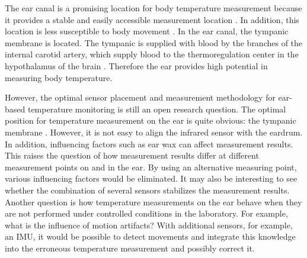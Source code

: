 The ear canal is a promising location for body temperature measurement because it provides a stable and easily accessible measurement location \cite{ericksonComparisonEarbasedBladder1993}.
In addition, this location is less susceptible to body movement \cite{grossmanFrequencyVelocityRotational1988, kavanaghRoleNeckTrunk2006a}.
In the ear canal, the tympanic membrane is located.
The tympanic is supplied with blood by the branches of the internal carotid artery, which supply blood to the thermoregulation center in the hypothalamus of the brain \cite{moranCoreTemperatureMeasurement2002a}.
Therefore the ear provides high potential in measuring body temperature.

However, the optimal sensor placement and measurement methodology for ear-based temperature monitoring is still an open research question. 
The optimal position for temperature measurement on the ear is quite obvious: the tympanic membrane \cite{childsTympanicMembraneTemperature1999, kimComparisonBilateralEardrum2022, mumaComparisonRectalAxillary1991}.
However, it is not easy to align the infrared sensor with the eardrum. In addition, influencing factors such as ear wax can affect measurement results. 
This raises the question of how measurement results differ at different measurement points on and in the ear. 
By using an alternative measuring point, various influencing factors would be eliminated.
It may also be interesting to see whether the combination of several sensors stabilizes the measurement results.
Another question is how temperature measurements on the ear behave when they are not performed under controlled conditions in the laboratory.
For example, what is the influence of motion artifacts?
With additional sensors, for example, an IMU, it would be possible to detect movements and integrate this knowledge into the erroneous temperature measurement and possibly correct it.

